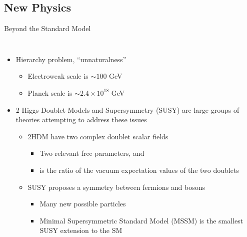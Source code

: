 \documentclass[aspectratio=169,xcolor=table]{beamer}
\begin{document}
  \subsection{New Physics }

    \begin{frame}[t]{Beyond the Standard Model}
      \begin{columns}[t]
        \begin{itemize}
          \item Hierarchy problem, ``unnaturalness''
          \begin{itemize}
            \item Electroweak scale is $\sim 100$ GeV
            \item Planck scale is $\sim 2.4 \times 10^{18}$ GeV
          \end{itemize}
          \item 2 Higgs Doublet Models and Supersymmetry (SUSY) are large groups of theories attempting to address these issues
          \begin{itemize}
            \item 2HDM have two complex doublet scalar fields \cite{2HDM}
            \begin{itemize}
              \item Two relevant free parameters, \tanb and \mHpm
              \item \tanb is the ratio of the vacuum expectation values of the two doublets
            \end{itemize}
            \item SUSY proposes a symmetry between fermions and bosons
              \begin{itemize}
                \item Many new possible particles
                \item Minimal Supersymmetric Standard Model (MSSM) is the smallest SUSY extension to the SM

\end{itemize}
\end{itemize}
\end{itemize}
\end{columns}
\end{frame}
\end{document}
